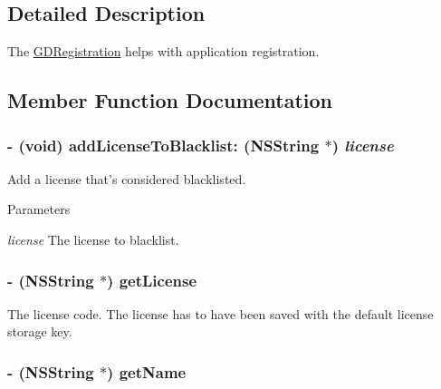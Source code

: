 \subsection{Detailed Description}
The \hyperlink{interface_g_d_registration}{GDRegistration} helps with application registration. 

\subsection{Member Function Documentation}
\hypertarget{interface_g_d_registration_a7b212d406ecc9f8dc9dc19714baac7f8}{
\subsubsection[{addLicenseToBlacklist:}]{\setlength{\rightskip}{0pt plus 5cm}-\/ (void) addLicenseToBlacklist: ({\bf NSString} $\ast$) {\em license}}}
\label{interface_g_d_registration_a7b212d406ecc9f8dc9dc19714baac7f8}


Add a license that's considered blacklisted. 
\begin{DoxyParams}{Parameters}
\item[{\em license}]The license to blacklist. \end{DoxyParams}
\hypertarget{interface_g_d_registration_ad8830b56a002a550f28c095233078aba}{
\subsubsection[{getLicense}]{\setlength{\rightskip}{0pt plus 5cm}-\/ ({\bf NSString} $\ast$) getLicense }}
\label{interface_g_d_registration_ad8830b56a002a550f28c095233078aba}


The license code. The license has to have been saved with the default license storage key. \hypertarget{interface_g_d_registration_a748a7113b6adcf0337c820aa56bb01ed}{
\subsubsection[{getName}]{\setlength{\rightskip}{0pt plus 5cm}-\/ ({\bf NSString} $\ast$) getName }}
\label{interface_g_d_registration_a748a7113b6adcf0337c820aa56bb01ed}


